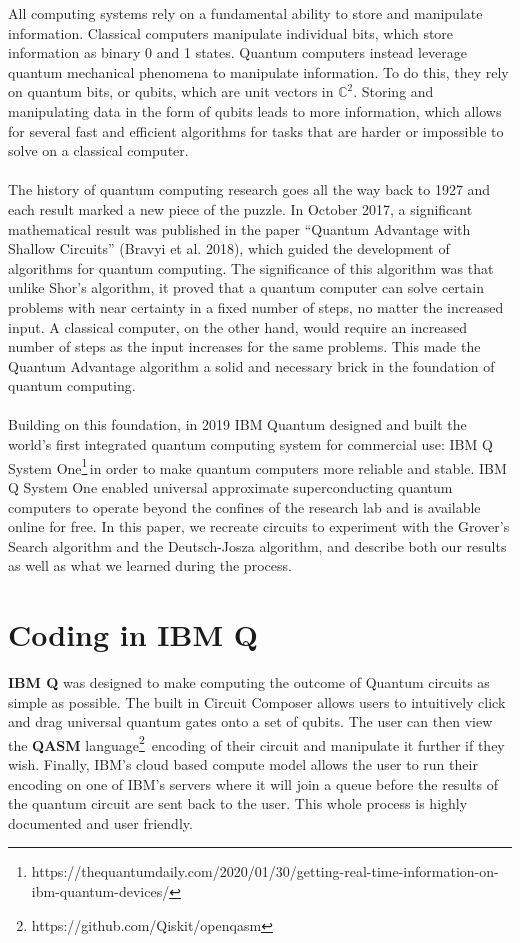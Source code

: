 \documentclass[12pt]{article}
\newcommand{\qasm}{\footnote{https://github.com/Qiskit/openqasm}}
\newcommand{\ibm}{\footnote{https://thequantumdaily.com/2020/01/30/getting-real-time-information-on-ibm-quantum-devices/}}
\begin{document}
    \noindent
    All computing systems rely on a fundamental ability to store and manipulate information. Classical computers manipulate individual bits, which store information as binary 0 and 1 states. Quantum computers instead leverage quantum mechanical phenomena to manipulate information. To do this, they rely on quantum bits, or qubits, which are unit vectors in $\mathbb{C}^2$. Storing and manipulating data in the form of qubits leads to more information, which allows for several fast and efficient algorithms for tasks that are harder or impossible to solve on a classical computer.
    \\
    \smallskip
    \\
    The history of quantum computing research goes all the way back to 1927 and each result marked a new piece of the puzzle. In October 2017, a significant mathematical result was published in the paper “Quantum Advantage with Shallow Circuits” (Bravyi et al. 2018), which guided the development of algorithms for quantum computing. The significance of this algorithm was that unlike Shor’s algorithm, it proved that a quantum computer can solve certain problems with near certainty in a fixed number of steps, no matter the increased input. A classical computer, on the other hand,  would require an increased number of steps as the input increases for the same problems. This made the Quantum Advantage algorithm a solid and necessary brick in the foundation of quantum computing.
    \\
    \smallskip
    \\
    Building on this foundation, in 2019 IBM Quantum designed and built the world’s first integrated quantum computing system for commercial use: IBM Q System One\ibm\,in order to make quantum computers more reliable and stable. IBM Q System One enabled universal approximate superconducting quantum computers to operate beyond the confines of the research lab and is available online for free. In this paper, we recreate circuits to experiment with the Grover’s Search algorithm and the Deutsch-Josza algorithm, and describe both our results as well as what we learned during the process.


\section{Coding in IBM Q}
    \textbf{IBM Q} was designed to make computing the outcome of Quantum circuits as simple as possible. The built in Circuit Composer allows users to intuitively click and drag universal quantum gates onto a set of qubits. The user can then view the \textbf{QASM} language\qasm \ encoding of their circuit and manipulate it further if they wish. Finally, IBM's cloud based compute model allows the user to run their encoding on one of IBM's servers where it will join a queue before the results of the quantum circuit are sent back to the user. This whole process is highly documented and user friendly. 
    
\end{document}

